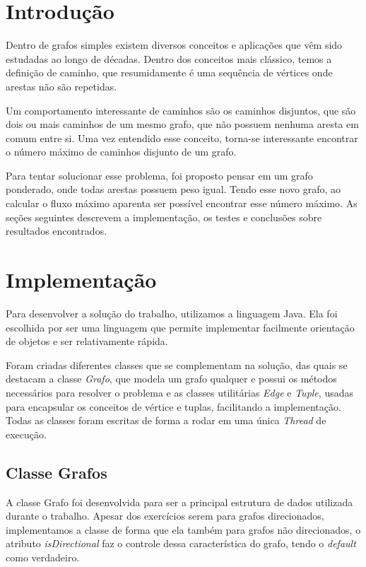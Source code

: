 
\section{\esp Introdução}

Dentro de grafos simples existem diversos conceitos e aplicações que vêm sido estudadas ao longo de décadas. Dentro dos conceitos mais clássico, temos a definição de caminho, que resumidamente é uma sequência de vértices onde arestas não são repetidas. 

Um comportamento interessante de caminhos são os caminhos disjuntos, que são dois ou mais caminhos de um mesmo grafo, que não possuem nenhuma aresta em comum entre si. Uma vez entendido esse conceito, torna-se interessante encontrar o número máximo de caminhos disjunto de um grafo.

Para tentar solucionar esse problema, foi proposto pensar em um grafo ponderado, onde todas arestas possuem peso igual. Tendo esse novo grafo, ao calcular o fluxo máximo aparenta ser possível encontrar esse número máximo. As seções seguintes descrevem a implementação, os testes e conclusões sobre resultados encontrados.

\section{\esp Implementação}

Para desenvolver a solução do trabalho, utilizamos a linguagem Java. Ela foi escolhida por ser uma linguagem que permite implementar facilmente orientação de objetos e ser relativamente rápida. 

Foram criadas diferentes classes que se complementam na solução, das quais se destacam a classe \textit{Grafo}, que modela um grafo qualquer e possui os métodos necessários para resolver o problema e as classes utilitárias \textit{Edge} e \textit{Tuple}, usadas para encapsular os conceitos de vértice e tuplas, facilitando a implementação. Todas as classes foram escritas de forma a rodar em uma única \textit{Thread} de execução.

\subsection{\esp Classe Grafos}

A classe Grafo foi desenvolvida para ser a principal estrutura de dados utilizada durante o trabalho. Apesar dos exercícios serem para grafos direcionados, implementamos a classe de forma que ela também para grafos não direcionados, o atributo \textit{isDirectional} faz o controle dessa característica do grafo, tendo o \textit{default} como verdadeiro.


